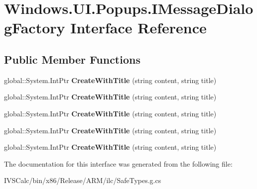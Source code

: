 \hypertarget{interface_windows_1_1_u_i_1_1_popups_1_1_i_message_dialog_factory}{}\section{Windows.\+U\+I.\+Popups.\+I\+Message\+Dialog\+Factory Interface Reference}
\label{interface_windows_1_1_u_i_1_1_popups_1_1_i_message_dialog_factory}
\subsection*{Public Member Functions}
\begin{DoxyCompactItemize}
\item 
\mbox{\label{interface_windows_1_1_u_i_1_1_popups_1_1_i_message_dialog_factory_ae1cc9380f8b7daf25dc771df7cd46e10}} 
global\+::\+System.\+Int\+Ptr {\bfseries Create\+With\+Title} (string content, string title)
\item 
\mbox{\label{interface_windows_1_1_u_i_1_1_popups_1_1_i_message_dialog_factory_ae1cc9380f8b7daf25dc771df7cd46e10}} 
global\+::\+System.\+Int\+Ptr {\bfseries Create\+With\+Title} (string content, string title)
\item 
\mbox{\label{interface_windows_1_1_u_i_1_1_popups_1_1_i_message_dialog_factory_ae1cc9380f8b7daf25dc771df7cd46e10}} 
global\+::\+System.\+Int\+Ptr {\bfseries Create\+With\+Title} (string content, string title)
\item 
\mbox{\label{interface_windows_1_1_u_i_1_1_popups_1_1_i_message_dialog_factory_ae1cc9380f8b7daf25dc771df7cd46e10}} 
global\+::\+System.\+Int\+Ptr {\bfseries Create\+With\+Title} (string content, string title)
\item 
\mbox{\label{interface_windows_1_1_u_i_1_1_popups_1_1_i_message_dialog_factory_ae1cc9380f8b7daf25dc771df7cd46e10}} 
global\+::\+System.\+Int\+Ptr {\bfseries Create\+With\+Title} (string content, string title)
\end{DoxyCompactItemize}


The documentation for this interface was generated from the following file\+:\begin{DoxyCompactItemize}
\item 
I\+V\+S\+Calc/bin/x86/\+Release/\+A\+R\+M/ilc/Safe\+Types.\+g.\+cs\end{DoxyCompactItemize}
